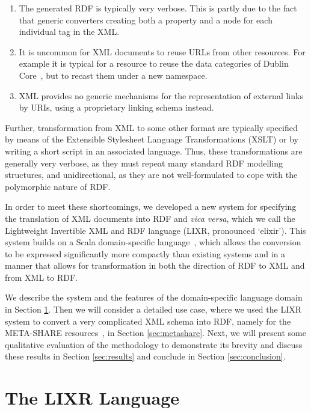 \documentclass{acm_proc_article-sp}
\begin{document}
\begin{enumerate}
\item The generated RDF is typically very verbose. This is partly due to the fact that generic
converters creating both a property and a node for each individual tag in the XML.
\item It is uncommon for XML documents to reuse URLs from other resources. For
example it is typical for a resource to reuse the data categories of Dublin Core~\cite{weibel1998dublin}, 
but to recast them under a new namespace.
\item XML provides no generic mechanisms for the representation of external links by URIs, using a proprietary linking schema instead.
\end{enumerate}

Further, transformation from XML to some other format are typically specified by means of  the  Extensible Stylesheet Language
Transformations (XSLT) or 
by writing a short script in an associated language. Thus, these transformations
are generally very verbose, as they must repeat many standard RDF modelling
structures, and unidirectional, as they are not well-formulated to cope with the 
polymorphic nature of RDF.

In order to meet these shortcomings, we developed a new system for specifying the
translation of XML documents into RDF and \emph{vica versa}, which we call the Lightweight Invertible
XML and RDF language (LIXR, pronounced `elixir'). This system builds on a 
Scala domain-specific language~\cite[DSL]{fowler2010domain,wampler2008programming}, which allows the conversion to be
expressed significantly more compactly than existing systems and in a manner
that allows for transformation in both the direction of RDF to XML and from XML
to RDF.

We describe the system and the features of the domain-specific language domain in Section
\ref{sec:dsl}. Then we will consider a detailed use case, where we used the LIXR
system to convert a very complicated XML schema into RDF, namely for the META-SHARE
resources~\cite{mccrae2015ontology,piperidis2012meta}, in Section \ref{sec:metashare}. Next, we will present some qualitative evaluation
of the methodology to demonstrate its brevity and discuss these results in Section
\ref{sec:results} and conclude in Section \ref{sec:conclusion}.

\section{The LIXR Language}
\label{sec:dsl}
\end{document}
